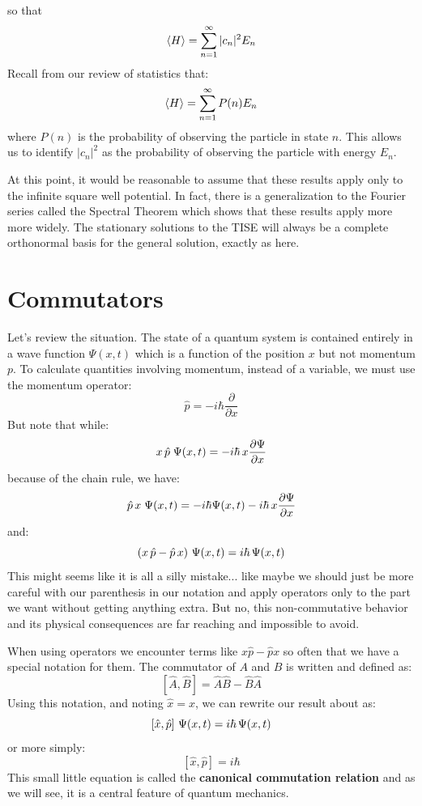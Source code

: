 \documentclass[12pt]{book}
\begin{document}
so that  
\begin{equation}  
\braket{H} = \sum_{n=1}^{\infty} |c_n|^2 E_n
\end{equation}
Recall from our review of statistics that:
\begin{equation}  
\braket{H} = \sum_{n=1}^{\infty} P(n) E_n
\end{equation}
where $P(n)$ is the probability of observing the particle in state $n$.  This allows us to identify $|c_n|^2$ as the probability of observing the particle with energy $E_n$.

At this point, it would be reasonable to assume that these results apply only to the infinite square well potential.  In fact, there is a generalization to the Fourier series called the Spectral Theorem which shows that these results apply more more widely.  The stationary solutions to the TISE will always be a complete orthonormal basis for the general solution, exactly as here. 


\section{Commutators}

Let's review the situation.  The state of a quantum system is contained entirely in a wave function $\Psi(x,t)$ which is a function of the position $x$ but not momentum $p$.  To calculate quantities involving momentum, instead of a variable, we must use the momentum operator:
$$\hat{p} = -i \hbar \frac{\partial}{\partial x}$$
But note that while:
$$ x \, \hat{p} \; \Psi(x, t) = -i \hbar \, x \frac{\partial \Psi}{\partial x}$$
because of the chain rule, we have:
$$ \hat{p} \, x \; \Psi(x, t) = -i \hbar \Psi(x,t) - i \hbar \, x \frac{\partial \Psi}{\partial x}$$
and:
$$ \left( x \, \hat{p} - \hat{p} \, x \right) \, \Psi(x, t) = i \hbar \, \Psi(x,t) $$
This might seems like it is all a silly mistake... like maybe we should just be more careful with our parenthesis in our notation and apply operators only to the part we want without getting anything extra.  But no, this non-commutative behavior and its physical consequences are far reaching and impossible to avoid.

When using operators we encounter terms like $x\hat{p} - \hat{p}x$ so often that we have a special notation for them.  The commutator of $A$ and $B$ is written and defined as:
\begin{equation}
\label{eqn:commutator}
\left[\hat{A}, \hat{B}\right] = \hat{A} \hat{B} - \hat{B} \hat{A} 
\end{equation}
Using this notation, and noting $\hat{x}=x$, we can rewrite our result about as:
$$ \left[ \hat{x} , \hat{p} \right] \, \Psi(x, t) = i \hbar \, \Psi(x,t) $$
or more simply:
\begin{equation}
\label{eqn:pxcom}
\left[\hat{x}, \hat{p}\right] = i \hbar 
\end{equation}
This small little equation is called the {\bf canonical commutation relation} and as we will see, it is a central feature of quantum mechanics.
\end{document}
